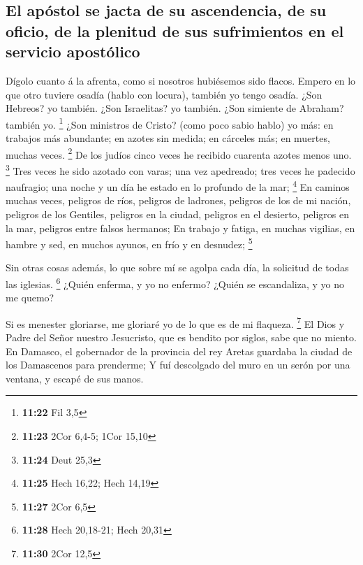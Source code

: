 \hypertarget{el-apuxf3stol-se-jacta-de-su-ascendencia-de-su-oficio-de-la-plenitud-de-sus-sufrimientos-en-el-servicio-apostuxf3lico}{%
\subsection{El apóstol se jacta de su ascendencia, de su oficio, de la
plenitud de sus sufrimientos en el servicio
apostólico}\label{el-apuxf3stol-se-jacta-de-su-ascendencia-de-su-oficio-de-la-plenitud-de-sus-sufrimientos-en-el-servicio-apostuxf3lico}}

 Dígolo cuanto á la afrenta, como si nosotros hubiésemos
sido flacos. Empero en lo que otro tuviere osadía (hablo con locura),
también yo tengo osadía.  ¿Son Hebreos? yo también. ¿Son
Israelitas? yo también. ¿Son simiente de Abraham? también yo.
\footnote{\textbf{11:22} Fil 3,5}  ¿Son ministros de
Cristo? (como poco sabio hablo) yo más: en trabajos más abundante; en
azotes sin medida; en cárceles más; en muertes, muchas veces.
\footnote{\textbf{11:23} 2Cor 6,4-5; 1Cor 15,10}  De los
judíos cinco veces he recibido cuarenta azotes menos uno. \footnote{\textbf{11:24}
  Deut 25,3}  Tres veces he sido azotado con varas; una
vez apedreado; tres veces he padecido naufragio; una noche y un día he
estado en lo profundo de la mar; \footnote{\textbf{11:25} Hech 16,22;
  Hech 14,19}  En caminos muchas veces, peligros de ríos,
peligros de ladrones, peligros de los de mi nación, peligros de los
Gentiles, peligros en la ciudad, peligros en el desierto, peligros en la
mar, peligros entre falsos hermanos;  En trabajo y
fatiga, en muchas vigilias, en hambre y sed, en muchos ayunos, en frío y
en desnudez; \footnote{\textbf{11:27} 2Cor 6,5}

 Sin otras cosas además, lo que sobre mí se agolpa cada
día, la solicitud de todas las iglesias. \footnote{\textbf{11:28} Hech
  20,18-21; Hech 20,31}  ¿Quién enferma, y yo no enfermo?
¿Quién se escandaliza, y yo no me quemo?

 Si es menester gloriarse, me gloriaré yo de lo que es de
mi flaqueza. \footnote{\textbf{11:30} 2Cor 12,5}  El Dios
y Padre del Señor nuestro Jesucristo, que es bendito por siglos, sabe
que no miento.  En Damasco, el gobernador de la provincia
del rey Aretas guardaba la ciudad de los Damascenos para prenderme;
 Y fuí descolgado del muro en un serón por una ventana, y
escapé de sus manos.

